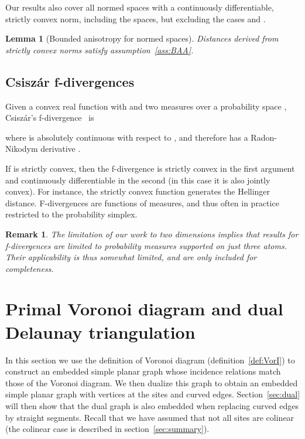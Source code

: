 \documentclass[11pt]{article}
\newtheorem{lemma}{Lemma}
\newtheorem{remark}{Remark}
\begin{document}
Our results also cover all normed spaces with a continuously differentiable, strictly convex norm, 
	including the  spaces, 
	but excluding the cases  and . 
\begin{lemma}[Bounded anisotropy for normed spaces]\label{lem:Lpgamma}
	Distances derived from strictly convex  norms satisfy assumption~\ref{ass:BAA}.
\end{lemma}


\subsection{Csisz\'ar f-divergences}\label{sec:Df}

Given a convex real function  with  and two measures  over a probability space , 
	Csisz\'ar's f-divergence~\cite{CsiszarTutorial} is

where  is absolutely continuous with respect to , 
	and therefore has a Radon-Nikodym derivative . 

If  is strictly convex, then the f-divergence is strictly convex in the first argument and continuously differentiable in the second 
(in this case it is also jointly convex). 
For instance, the strictly convex function  generates the Hellinger distance. 
F-divergences are functions of measures, and thus often in practice restricted to the probability simplex. 

\begin{remark}The limitation of our work to two dimensions implies that results for f-divergences 
	are limited to probability measures supported on just three atoms. 
Their applicability is thus somewhat limited, and  are only included for completeness. 
\end{remark}







\section{Primal Voronoi diagram and dual Delaunay triangulation}\label{sec:planar}




In this section we use the definition of Voronoi diagram (definition~\ref{def:VorI})
	to construct an embedded simple planar graph whose incidence relations match 
	those of the Voronoi diagram. 
We then dualize this graph to obtain an embedded simple planar graph 
	with vertices at the sites and curved edges. 
Section~\ref{sec:dual} will then show that the dual graph is also embedded when replacing curved edges by straight segments. 
Recall that we have assumed that not all sites are colinear (the colinear case is described in section~\ref{sec:summary}). 
\end{document}
